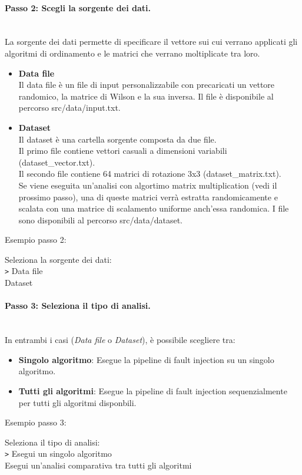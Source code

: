 \documentclass{article}
\begin{document}
\paragraph{Passo 2: Scegli la sorgente dei dati.}\leavevmode\\
La sorgente dei dati permette di specificare il vettore sui cui verrano applicati gli algoritmi di ordinamento e le matrici che verrano moltiplicate tra loro.
\begin{itemize}
    \item \textbf{Data file} \\Il data file è un file di input personalizzabile con precaricati un vettore randomico, la matrice di Wilson e la sua inversa. Il file è disponibile al percorso src/data/input.txt.
    \item \textbf{Dataset} \\ Il dataset è una cartella sorgente composta da due file. \\
    Il primo file contiene vettori casuali a dimensioni variabili (dataset\_vector.txt). \\ 
    Il secondo file contiene 64 matrici di rotazione 3x3 (dataset\_matrix.txt). \\
    Se viene eseguita un'analisi con algortimo matrix multiplication (vedi il prossimo passo), una di queste matrici verrà estratta randomicamente e scalata con una matrice di scalamento uniforme anch'essa randomica.
    I file sono disponibili al percorso src/data/dataset.
\end{itemize}
Esempio passo 2:
\begin{tcolorbox}[colback=black, coltext=white, sharp corners, boxrule=0.5mm, width=\textwidth]
    Seleziona la sorgente dei dati: \\
    \texttt{>} Data file \\
    \hspace{2.5em}Dataset
\end{tcolorbox}


\paragraph{Passo 3: Seleziona il tipo di analisi.}\leavevmode\\
In entrambi i casi (\textit{Data file} o \textit{Dataset}), è possibile scegliere tra:
\begin{itemize}
    \item \textbf{Singolo algoritmo}: Esegue la pipeline di fault injection su un singolo algoritmo.
    \item \textbf{Tutti gli algoritmi}: Esegue la pipeline di fault injection sequenzialmente per tutti gli algoritmi disponbili.
\end{itemize}
Esempio passo 3:
\begin{tcolorbox}[colback=black, coltext=white, sharp corners, boxrule=0.5mm, width=\textwidth]
    Seleziona il tipo di analisi: \\
    \texttt{>} Esegui un singolo algoritmo \\
    \hspace{2.5em}Esegui un'analisi comparativa tra tutti gli algoritmi
\end{tcolorbox}
\end{document}

